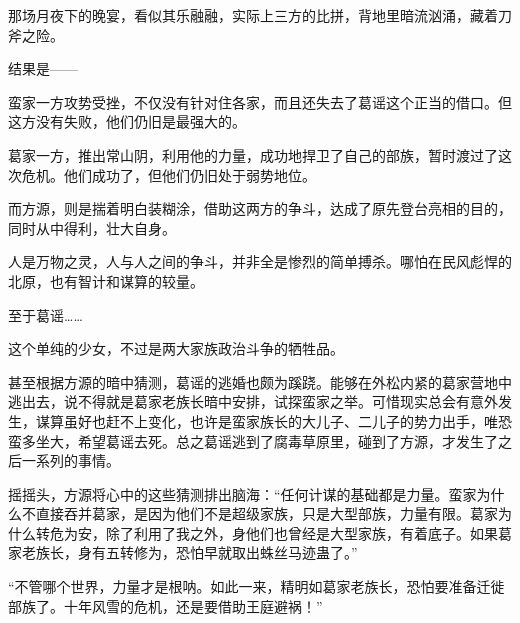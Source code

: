 \begin{this_body}
那场月夜下的晚宴，看似其乐融融，实际上三方的比拼，背地里暗流汹涌，藏着刀斧之险。

结果是——

蛮家一方攻势受挫，不仅没有针对住各家，而且还失去了葛谣这个正当的借口。但这方没有失败，他们仍旧是最强大的。

葛家一方，推出常山阴，利用他的力量，成功地捍卫了自己的部族，暂时渡过了这次危机。他们成功了，但他们仍旧处于弱势地位。

而方源，则是揣着明白装糊涂，借助这两方的争斗，达成了原先登台亮相的目的，同时从中得利，壮大自身。

人是万物之灵，人与人之间的争斗，并非全是惨烈的简单搏杀。哪怕在民风彪悍的北原，也有智计和谋算的较量。

至于葛谣……

这个单纯的少女，不过是两大家族政治斗争的牺牲品。

甚至根据方源的暗中猜测，葛谣的逃婚也颇为蹊跷。能够在外松内紧的葛家营地中逃出去，说不得就是葛家老族长暗中安排，试探蛮家之举。可惜现实总会有意外发生，谋算虽好也赶不上变化，也许是蛮家族长的大儿子、二儿子的势力出手，唯恐蛮多坐大，希望葛谣去死。总之葛谣逃到了腐毒草原里，碰到了方源，才发生了之后一系列的事情。

摇摇头，方源将心中的这些猜测排出脑海：“任何计谋的基础都是力量。蛮家为什么不直接吞并葛家，是因为他们不是超级家族，只是大型部族，力量有限。葛家为什么转危为安，除了利用了我之外，身他们也曾经是大型家族，有着底子。如果葛家老族长，身有五转修为，恐怕早就取出蛛丝马迹蛊了。”

“不管哪个世界，力量才是根呐。如此一来，精明如葛家老族长，恐怕要准备迁徙部族了。十年风雪的危机，还是要借助王庭避祸！”

\end{this_body}

